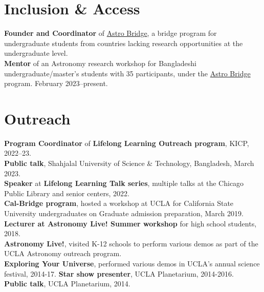 \documentclass[margin, line]{res}
\begin{document}
\begin{resume}
\section{\sc Inclusion \& Access}
{\bf Founder and Coordinator} of \href{https://www.astrobridge.org/}{Astro Bridge}, a bridge program for undergraduate students from countries lacking research opportunities at the undergraduate level. \\
{\bf Mentor} of an Astronomy research workshop for Bangladeshi undergraduate/master's students with 35 participants, under the \href{https://www.astrobridge.org/projects/bdlensing}{Astro Bridge} program. February 2023--present. \\ 

\section{\sc Outreach}
{\bf Program Coordinator} of {\bf Lifelong Learning Outreach program}, KICP, 2022--23. \\
{\bf Public talk}, Shahjalal University of Science \& Technology, Bangladesh, March 2023. \\
{\bf Speaker} at {\bf Lifelong Learning Talk series}, multiple talks at the Chicago Public Library and senior centers, 2022. \\
{\bf Cal-Bridge program}, hosted a workshop at UCLA for California State University undergraduates on Graduate admission preparation, March 2019. \\
{\bf Lecturer at Astronomy Live! Summer workshop} for high school students, 2018. \\
{\bf Astronomy Live!}, visited K-12 schools to perform various demos as part of the UCLA Astronomy outreach program. \\
{\bf Exploring Your Universe}, performed various demos in UCLA's annual science festival, 2014-17.
{\bf Star show presenter}, UCLA Planetarium, 2014-2016. \\
{\bf Public talk}, UCLA Planetarium, 2014. \\




\end{resume}
\end{document}
